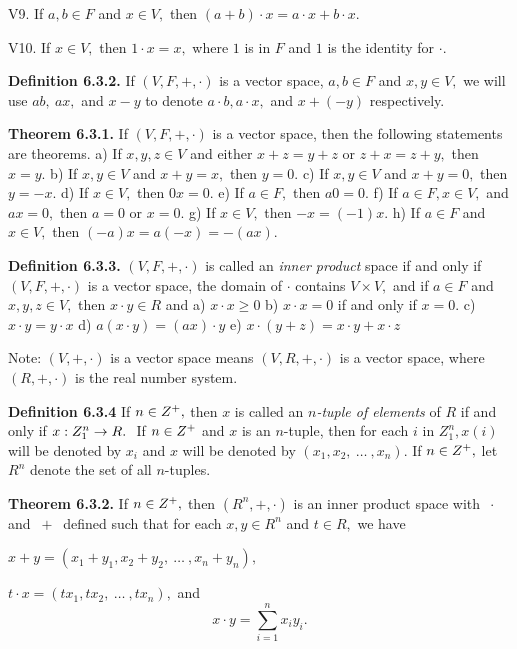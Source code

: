 \qquad V9. If $a,b\in F$ and $x\in V,$ then $(a + b)\cdot x = a\cdot x + b\cdot x.$ \nl

\qquad V10. If $x\in V,$ then $1\cdot x = x,$ where $1$ is in $F$ and $1$ is the identity for $\cdot.$ \nl

\textbf{Definition 6.3.2.} If $(V,F,+,\cdot)$ is a vector space, $a,b\in F$ and $x,y\in V,$ we will use $ab,~ ax,$ and $x - y$ to denote $a\cdot b, a\cdot x,$ and $x + (-y)$ respectively. \nl

\textbf{Theorem 6.3.1.} If $(V,F,+,\cdot )$ is a vector space, then the following statements are theorems. \nl
a) If $x,y,z\in V$ and either $x + z = y + z$ or $z + x = z + y,$ then $x = y.$\nl
b) If $x,y\in V$ and $x + y = x,$ then $y = 0.$\nl
c) If $x,y\in V$ and $x + y =0,$ then $y = -x.$\nl
d) If $x\in V,$ then $0x = 0.$\nl
e) If $a\in F,$ then $a0 = 0.$\nl
f) If $a\in F, x\in V,$ and $ax = 0,$ then $a = 0$ or $x = 0.$\nl
g) If $x\in V,$ then $-x = (-1)x.$\nl
h) If $a\in F$ and $x\in V,$ then $(-a)x = a(-x) = -(ax).$\nl

\textbf{Definition 6.3.3.} $(V,F,+,\cdot)$ is called an \textit{inner product} space if and only if $(V,F,+,\cdot)$ is a vector space, the domain of $\cdot$ contains $V\times V,$ and if $a\in F$ and $x,y,z\in V,$ then $x\cdot y\in R$ and \nl
a) $x\cdot x \geq 0$\nl
b) $x\cdot x = 0$ if and only if $x = 0.$ \nl
c) $x\cdot y = y\cdot x$\nl
d) $a(x\cdot y) =(ax)\cdot y $\nl
e) $x\cdot (y + z) = x\cdot y + x\cdot z$\nl

Note: $(V,+,\cdot)$ is a vector space means $(V,R,+,\cdot)$ is a vector space, where $(R,+,\cdot)$ is the real
number system. \nl

\textbf{Definition 6.3.4} If $n\in Z^{+},$ then $x$ is called an $n$\textit{-tuple of elements} of $R$ if and only if $x : Z_{1}^{n} \to R.~$  If $n\in Z^{+}$ and $x$ is an $n$-tuple, then for each $i$ in $Z_{1}^{n}, x(i)$ will be denoted by $x_{i}$ and $x$ will be denoted by $(x_{1} , x_{2},~ \dots ~,x_{n}).$ If $n\in Z^{+},$ let $R^{n}$ denote the set of all $n$-tuples. \nl

\textbf{Theorem 6.3.2.} If $n\in Z^{+},$ then $(R^{n},+,\cdot)$ is an inner product space
with $~\cdot~$ and $~+~$ defined such that for each $x,y\in R^{n}$ and $t\in R,$ we have\nl

$x + y=(x_{1} + y_{1}, x_{2} + y_{2} , ~\dots ~ ,x_{n} + y_{n}),$\nl

$t\cdot x = (tx_{1}, tx_{2}, ~\dots ~ ,tx_{n}),$ and
\[
x\cdot y = \sum\limits_{i=1}^{n}x_{i}y_{i}.
\]

